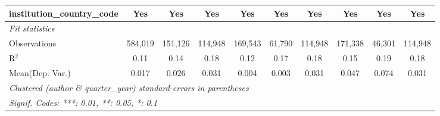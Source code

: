 \begin{tabular}{lccccccccc}
   institution\_country\_code             & Yes           & Yes           & Yes           & Yes          & Yes          & Yes           & Yes           & Yes           & Yes\\  
   \midrule
   \emph{Fit statistics}\\
   Observations                           & 584,019       & 151,126       & 114,948       & 169,543      & 61,790       & 114,948       & 171,338       & 46,301        & 114,948\\  
   R$^2$                                  & 0.11          & 0.14          & 0.18          & 0.12         & 0.17         & 0.18          & 0.15          & 0.19          & 0.18\\  
Mean(Dep. Var.) & 0.017 & 0.026 & 0.031 & 0.004 & 0.003 & 0.031 & 0.047 & 0.074 & 0.031 \\
   \midrule \midrule
   \multicolumn{10}{l}{\emph{Clustered (author \& quarter\_year) standard-errors in parentheses}}\\
   \multicolumn{10}{l}{\emph{Signif. Codes: ***: 0.01, **: 0.05, *: 0.1}}\\
\end{tabular}
\par\endgroup
